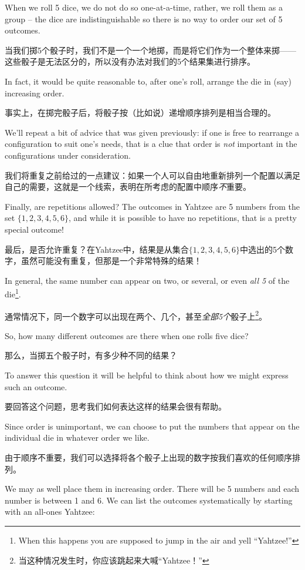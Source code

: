 When we roll 5 dice, we do not do so 
one-at-a-time, rather, we roll them as a group -- the dice are 
indistinguishable so there is no way to order our set of 5 outcomes.

当我们掷5个骰子时，我们不是一个一个地掷，而是将它们作为一个整体来掷——这些骰子是无法区分的，所以没有办法对我们的5个结果集进行排序。

In fact, it would be quite reasonable to, after one's roll, arrange the
die in (say) increasing order.

事实上，在掷完骰子后，将骰子按（比如说）递增顺序排列是相当合理的。

We'll repeat a bit of advice that was given
previously: if one is free to rearrange a configuration to suit one's needs,
that is a clue that order is \emph{not} important in the configurations
under consideration.

我们将重复之前给过的一点建议：如果一个人可以自由地重新排列一个配置以满足自己的需要，这就是一个线索，表明在所考虑的配置中顺序\emph{不}重要。

Finally, are repetitions allowed?  The outcomes
in Yahtzee are 5 numbers from the set $\{1,2,3,4,5,6\}$, and while it
is possible to have no repetitions, that is a pretty special outcome!

最后，是否允许重复？在Yahtzee中，结果是从集合$\{1,2,3,4,5,6\}$中选出的5个数字，虽然可能没有重复，但那是一个非常特殊的结果！

In general, the same number can appear on two, or several, or even 
\emph{all 5} of the die\footnote{When this happens you are supposed 
to jump in the air and yell ``Yahtzee!''}.

通常情况下，同一个数字可以出现在两个、几个，甚至\emph{全部5个}骰子上\footnote{当这种情况发生时，你应该跳起来大喊“Yahtzee！”}。

So, how many different outcomes
are there when one rolls five dice?

那么，当掷五个骰子时，有多少种不同的结果？

To answer this question it will
be helpful to think about how we might express such an outcome.

要回答这个问题，思考我们如何表达这样的结果会很有帮助。

Since order is unimportant, we can choose to put the numbers that appear
on the individual die in whatever order we like.

由于顺序不重要，我们可以选择将各个骰子上出现的数字按我们喜欢的任何顺序排列。

We may as well place them
in increasing order.  There will be 5 numbers and each number is between 1
and 6.  We can list the outcomes systematically by starting with an all-ones
Yahtzee:

